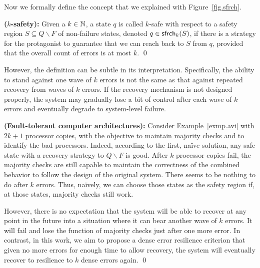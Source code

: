 Now we formally define the concept that we explained with Figure~\ref{fig.sfrch}.  

\begin{definition}{\bf ($k$-safety):} 
\label{k-safe}
Given a $k\in{\mathbb N}$, 
a state $q$ is called \mbox{$k$-safe} with respect to 
a safety region $S\subseteq Q\smallsetminus F$ of non-failure states, 
denoted $q\in\mathsf{sfrch}_k(S)$, if there 
is a strategy for the protagonist to guarantee that 
we can reach back to $S$ from $q$, provided that
the overall count of errors is at most $k$.
\qed 
\end{definition}

However, the definition can be subtle in its interpretation.  
Specifically, the ability to stand against one wave of $k$ errors 
is not the same as that against repeated recovery 
from waves of $k$ errors.  
If the recovery mechanism is not designed properly, 
the system may gradually lose a bit of control after each wave of $k$ errors 
and eventually degrade to system-level failure. 

\begin{example} 
{\bf (Fault-tolerant computer architectures):}  
\label{exmp.avi.revisit}
Consider Example~\ref{exmp.avi} with $2k+1$ processor copies, 
with the objective to maintain majority checks
and to identify the bad processors. 
Indeed, according to the first, na\"ive solution, 
any safe state with a recovery strategy to 
$Q\smallsetminus F$ is good.   
After $k$ processor copies fail, 
the majority checks are still capable to maintain the correctness
of the combined behavior to follow the design of the original system.  
There seems to be nothing to do after $k$ errors.  
Thus, na\"ively, we can choose those states as the safety region
\label{reply1.majority.checks.as.safety.regions} if, 
at those states, majority checks still work.  

However, there is no expectation that the system will be able
to recover at any point in the future into a situation where it can bear 
another wave of $k$ errors.   
It will fail and lose the function of majority checks just after one more error.  
In contrast, in this work, we aim to propose a dense error resilience criterion that 
given no more errors for enough time to allow recovery, 
the system will eventually recover to resilience to $k$ dense errors again. 
\qed 
\end{example} 

